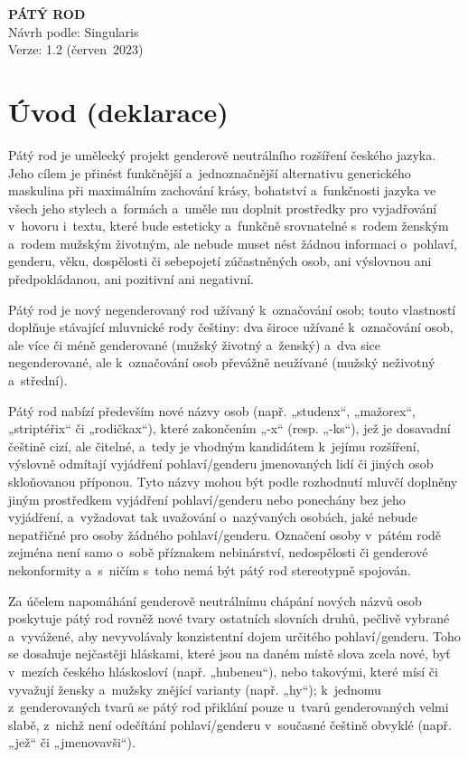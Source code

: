 \documentclass[10pt,draft]{article}
\begin{document}
\rmfamily%
%
%
\begin{center}%
{\Huge\bfseries PÁTÝ ROD\\}\medskip%
Návrh podle: Singularis\\%
Verze: 1.2 (červen 2023)
\end{center}%
\bigskip%
%
\section{Úvod (deklarace)}

Pátý rod je umělecký projekt genderově neutrálního rozšíření českého jazyka.
Jeho cílem je přinést funkčnější a jedno\-značnější alternativu generického
maskulina při maximálním zachování krásy, bohatství a funkčnosti jazyka
ve všech jeho stylech a formách a uměle mu doplnit prostředky
pro vyjadřování v hovoru i textu, které bude esteticky
a funkčně srovnatelné s rodem ženským a rodem
mužským životným, ale nebude muset nést žádnou informaci o pohlaví, genderu,
věku, dospělosti či sebepojetí zúčastněných osob, ani výslovnou ani předpokládanou,
ani pozitivní ani negativní.

Pátý rod je nový negenderovaný rod užívaný k označování osob;
touto vlastností doplňuje stávající mluvnické rody češtiny:
dva široce užívané k označování osob, ale více či méně genderované
(mužský životný a ženský) a dva sice negenderované, ale k označování osob
převážně neužívané (mužský neživotný a střední).

Pátý rod nabízí především nové názvy osob (např. „studenx“, „mažorex“, „striptéřix“
či „rodičkax“), které zakončením „-x“ (resp. „-ks“), jež je dosavadní češtině cizí,
ale čitelné, a tedy je vhodným kandidátem k jejímu rozšíření, výslovně odmítají
vyjádření pohlaví/genderu jmenovaných lidí či jiných osob skloňovanou příponou.
Tyto názvy mohou být podle rozhodnutí mluvčí doplněny jiným prostředkem
vyjádření pohlaví/genderu nebo ponechány bez jeho vyjádření,
a vyžadovat tak uvažování o nazývaných osobách, jaké nebude nepatřičné
pro osoby žádného pohlaví/genderu. Označení osoby v pátém rodě
zejména není samo o sobě příznakem nebinárství, nedospělosti
či genderové nekonformity a s ničím s toho nemá být pátý rod stereotypně
spojován.

Za účelem napomáhání genderově neutrálnímu chápání nových názvů osob
poskytuje pátý rod rovněž nové tvary ostatních slovních druhů,
pečlivě vybrané a vyvážené, aby nevyvolávaly konzistentní dojem
určitého pohlaví/genderu. Toho se dosahuje nejčastěji hláskami,
které jsou na daném místě slova zcela nové, byť v mezích českého hláskosloví
(např. „hubeneu“), nebo takovými, které mísí či vyvažují žensky a mužsky znějící
varianty (např. „hy“); k jednomu z genderovaných tvarů se pátý rod přiklání
pouze u tvarů genderovaných velmi slabě, z nichž není odečítání pohlaví/genderu
v současné češtině obvyklé (např. „jež“ či „jmenovavši“).
\end{document}
